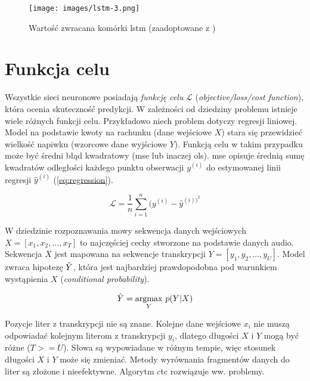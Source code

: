 \begin{figure}
    \centering
    \texttt{[image: images/lstm-3.png]}
    \caption{Wartość zwracana komórki \acrshort{lstm} (zaadoptowane z \cite{lstm:colah})}
    \label{fig:lstm-3}
\end{figure}


\section{Funkcja celu}
Wszystkie sieci neuronowe posiadają \emph{funkcję celu} $\mathcal{L}$ (\textit{objective/loss/cost function}), która ocenia skuteczność predykcji. W zależności od dziedziny problemu istnieje wiele różnych funkcji celu. Przykładowo niech problem dotyczy regresji liniowej. Model na podstawie kwoty na rachunku (dane wejściowe $X$) stara się przewidzieć wielkość napiwku (wzorcowe dane wyjściowe $Y$). Funkcją celu w takim przypadku może być średni błąd kwadratowy (\acrshort{mse} lub inaczej \acrshort{ols}). \acrshort{mse} opisuje średnią sumę kwadratów odległości każdego punktu obserwacji $y^{(i)}$ do estymowanej linii regresji $\hat{y}^{(i)}$ (\ref{eq:regression}).

\begin{equation}
\mathcal{L} = \frac{1}{n}\sum_{i=1}^n (y^{(i)} - \hat{y}^{(i))^2} \label{eq:regression}
\end{equation}

W dziedzinie rozpoznawania mowy sekwencja danych wejściowych $X=[x_1, x_2, ..., x_T]$ to najczęściej cechy stworzone na podstawie danych audio. Sekwencja $X$ jest mapowana na sekwencje transkrypcji $Y=[y_1, y_2, ..., y_U]$. Model zwraca hipotezę $\Hat{Y}$, która jest najbardziej prawdopodobna pod warunkiem wystąpienia $X$ (\textit{conditional probability}).

\begin{equation}
\Hat{Y} = \underset {Y}{\operatorname{argmax}} \ p(Y | X)
\end{equation}

Pozycje liter z transkrypcji nie są znane. Kolejne dane wejściowe $x_i$ nie muszą odpowiadać kolejnym literom z transkrypcji $y_i$, dlatego długości $X$ i $Y$ mogą być różne ($T >= U$). Słowa są wypowiadane w różnym tempie, więc stosunek długości $X$ i $Y$ może się zmieniać. Metody wyrównania fragmentów danych do liter są złożone i nieefektywne. Algorytm \acrshort{ctc} rozwiązuje ww. problemy.

